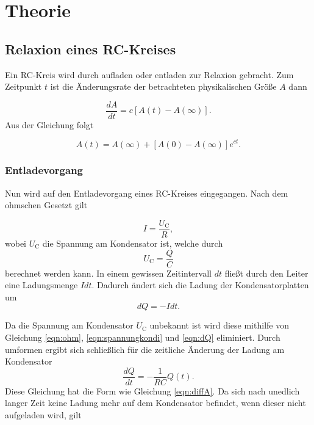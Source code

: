 \section{Theorie}
\label{sec:Theorie}

\subsection{Relaxion eines RC-Kreises}
Ein RC-Kreis wird durch aufladen oder entladen zur Relaxion gebracht.
Zum Zeitpunkt $t$ ist die Änderungsrate der betrachteten physikalischen Größe $A$ dann

\begin{equation}
    \frac{dA}{dt} = c \left[ A(t) - A(\infty)  \right]  .
    \label{eqn:diffA}
\end{equation}
Aus der Gleichung folgt 

\begin{equation}
    A(t) = A(\infty) + \left[ A(0) - A(\infty)  \right] e^{ct} .
\end{equation}

\subsubsection{Entladevorgang}

Nun wird auf den Entladevorgang eines RC-Kreises eingegangen.
Nach dem ohmschen Gesetzt gilt 

\begin{equation}
    I = \frac{U_\text{C}}{R}, 
    \label{eqn:ohm}
\end{equation}
wobei $U_\text{C}$ die Spannung am Kondensator ist, welche durch
\begin{equation}
    U_\text{C} = \frac{Q}{C}
    \label{eqn:spannungkondi}
\end{equation}
berechnet werden kann.
In einem gewissen Zeitintervall $dt$ fließt durch den Leiter eine Ladungsmenge $Idt$.
Dadurch ändert sich die Ladung der Kondensatorplatten um
\begin{equation}
    dQ = -Idt.
    \label{eqn:dQ}
\end{equation}

Da die Spannung am Kondensator $U_\text{C}$ unbekannt ist wird diese mithilfe von Gleichung \eqref{eqn:ohm}, \eqref{eqn:spannungkondi} und \eqref{eqn:dQ} eliminiert.
Durch umformen ergibt sich schließlich für die zeitliche Änderung der Ladung am Kondensator 
\begin{equation*}
    \frac{dQ}{dt} = - \frac{1}{RC} Q(t).
\end{equation*}
Diese Gleichung hat die Form wie Gleichung \eqref{eqn:diffA}.
Da sich nach unedlich langer Zeit keine Ladung mehr auf dem Kondensator befindet, wenn dieser nicht aufgeladen wird, gilt 

